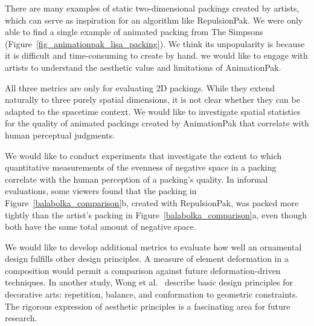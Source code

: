 There are many examples of static two-dimensional packings
	created by artists, which can serve as inspiration for an algorithm like RepulsionPak.  
	We were only able to find a single example of animated packing from The Simpsons (Figure~\ref{fig_animationpak_lisa_packing}). 
	We think its unpopularity is because it is difficult and time-consuming to create by hand.
	 we would like to engage with artists to understand the aesthetic value and limitations
	of AnimationPak.

All three metrics are only for evaluating 2D packings.
  While they extend naturally to three purely spatial
  dimensions, it is not clear whether they can be 
  adapted to the spacetime context.  
  We would like to investigate
  spatial statistics for the quality of animated packings created by AnimationPak that correlate
  with human perceptual judgments.

 We would like to conduct experiments that investigate the
  extent to which quantitative measurements of the evenness of negative
  space in a packing correlate with the human perception of a
  packing's quality.  In informal evaluations, some viewers found that
  the packing in Figure~\ref{balabolka_comparison}b, created with RepulsionPak,
  was packed more tightly than the artist's packing in
  Figure~\ref{balabolka_comparison}a, even though both have the same total
  amount of negative space.

 We would like to develop additional metrics to evaluate
  how well an ornamental design fulfills other design principles.
  A measure of element deformation in a composition would permit 
  a comparison against future deformation-driven techniques.
  In another study, Wong et al.~\cite{Wong1998} describe basic design
  principles for decorative arts: repetition, balance, and conformation
  to geometric constraints.  The rigorous expression of aesthetic principles
  is a fascinating area for future research.




